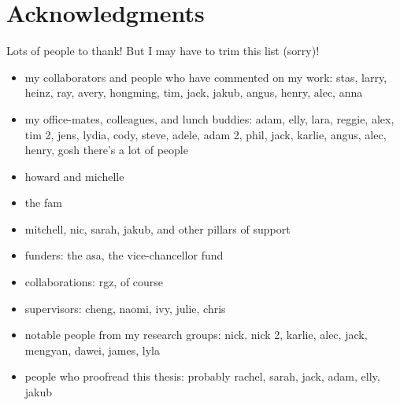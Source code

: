 \chapter*{Acknowledgments}

Lots of people to thank! But I may have to trim this list (sorry)!

\begin{itemize}
    \item my collaborators and people who have commented on my work: stas, larry, heinz, ray, avery, hongming, tim, jack, jakub, angus, henry, alec, anna
    \item my office-mates, colleagues, and lunch buddies: adam, elly, lara, reggie, alex, tim 2, jens, lydia, cody, steve, adele, adam 2, phil, jack, karlie, angus, alec, henry, gosh there's a lot of people
    \item howard and michelle
    \item the fam
    \item mitchell, nic, sarah, jakub, and other pillars of support
    \item funders: the asa, the vice-chancellor fund
    \item collaborations: rgz, of course
    \item supervisors: cheng, naomi, ivy, julie, chris
    \item notable people from my research groups: nick, nick 2, karlie, alec, jack, mengyan, dawei, james, lyla
    \item people who proofread this thesis: probably rachel, sarah, jack, adam, elly, jakub
\end{itemize}
